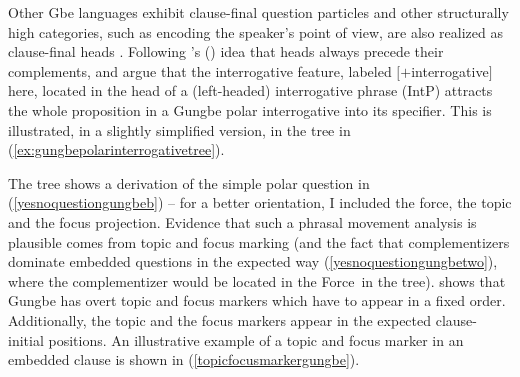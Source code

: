 \noindent Other Gbe languages exhibit clause-final question particles and other structurally high categories, such as encoding the speaker's point of view, are also realized as clause-final heads \citep[211--213]{lefebvre2006creole}. Following \citeauthor{kayne1994antisymmetry}'s (\citeyear{kayne1994antisymmetry}) idea that heads always precede their complements, \citet{aboh2004morphosyntax} and  \citet{aboh2004left} argue that the interrogative feature, labeled $[+$interrogative$]$ here, located in the head of a (left-headed) interrogative phrase (IntP) attracts the whole proposition in a Gungbe polar interrogative into its specifier. This is illustrated, in a slightly simplified version, in the tree in (\ref{ex:gungbepolarinterrogativetree}).

\begin{exe}
\ex\label{ex:gungbepolarinterrogativetree}
\end{exe}


\noindent The tree shows a derivation of the simple polar question in (\ref{yesnoquestiongungbeb}) -- for a better orientation, I included the force, the topic and the focus projection. Evidence that such a phrasal movement analysis is plausible comes from topic and focus marking (and the fact that complementizers dominate embedded questions in the expected way (\ref{yesnoquestiongungbetwo}), where the complementizer would be located in the Force\textdegree\ in the tree). \citet{aboh2004left} shows that Gungbe has overt topic and focus markers which have to appear in a fixed order. Additionally, the topic and the focus markers appear in the expected clause-initial positions. An illustrative example of a topic and focus marker in an embedded clause is shown in (\ref{topicfocusmarkergungbe}).


